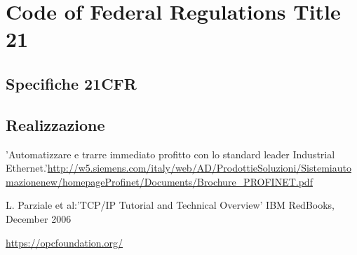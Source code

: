 \documentclass[12pt, a4paper, oneside]{book}
\begin{document}
\section{Code of Federal Regulations Title 21}
\subsection{Specifiche 21CFR}
\subsection{Realizzazione}






\newpage
\begin{thebibliography}{100}
	'Automatizzare e trarre immediato profitto con lo standard leader Industrial Ethernet.'\url{http://w5.siemens.com/italy/web/AD/ProdottieSoluzioni/Sistemiautomazionenew/homepageProfinet/Documents/Brochure_PROFINET.pdf}	
	
	L. Parziale et al:'TCP/IP Tutorial and Technical Overview' IBM RedBooks, December 2006
	
	\url{https://opcfoundation.org/}
	
	
	

	
\end{thebibliography}
\end{document}
